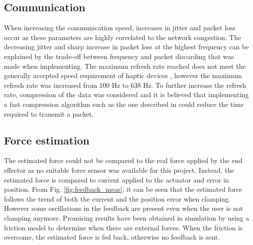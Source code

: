 
\subsection*{Communication}

When increasing the communication speed, increases in jitter and packet loss occur as these parameters are highly correlated to the network congestion. %
The decreasing jitter and sharp increase in packet loss at the highest frequency can be explained by the trade-off between frequency and packet discarding that was made when implementing.
The maximum refresh rate reached does not meet the generally accepted speed requirement of haptic devices \cite{coles2011role}, however the maximum refresh rate was increased from 100 Hz to 638 Hz.
To further increase the refresh rate, compression of the data was considered and it is believed that implementing a fast compression algorithm such as the one described in \cite{fast_ZIV} could reduce the time required to transmit a packet.

\subsection*{Force estimation}

The estimated force could not be compared to the real force applied by the end effector as no suitable force sensor was available for this project. Instead, the estimated force is compared to current applied to the actuator and error in position. From Fig. \ref{fig:feedback_meas}, it can be seen that the estimated force follows the trend of both the current and the position error when clamping. However some oscillations in the feedback are present even when the user is not clamping anymore. Promising results have been obtained in simulation by using a friction model to determine when there are external forces. When the friction is overcome, the estimated force is fed back, otherwise no feedback is sent.